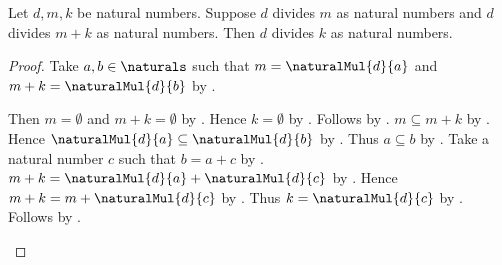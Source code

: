 \begin{theorem}\label{spike15_common_divisor_of_sum_difference}
    Let $d,m,k$ be natural numbers.
    Suppose $d$ divides $m$ as natural numbers and
        $d$ divides $m+k$ as natural numbers.
    Then $d$ divides $k$ as natural numbers.
\end{theorem}
\begin{proof}
    Take $a,b\in\naturals$ such that
        $m=\naturalMul{d}{a}$ and
        $m+k=\naturalMul{d}{b}$
        by .
    \begin{byCase}
            Then $m=\emptyset$ and $m+k=\emptyset$
                by .
            Hence $k=\emptyset$ by .
            Follows by .
            $m\subseteq m+k$ by
                .
            Hence $\naturalMul{d}{a}\subseteq\naturalMul{d}{b}$
                by \auto.
            Thus $a\subseteq b$
                by .
            Take a natural number $c$ such that $b=a+c$
                by .
            $m+k=\naturalMul{d}{a}+\naturalMul{d}{c}$
                by .
            Hence $m+k=m+\naturalMul{d}{c}$ by \auto.
            Thus $k=\naturalMul{d}{c}$
                by .
            Follows by .
    \end{byCase}
\end{proof}

